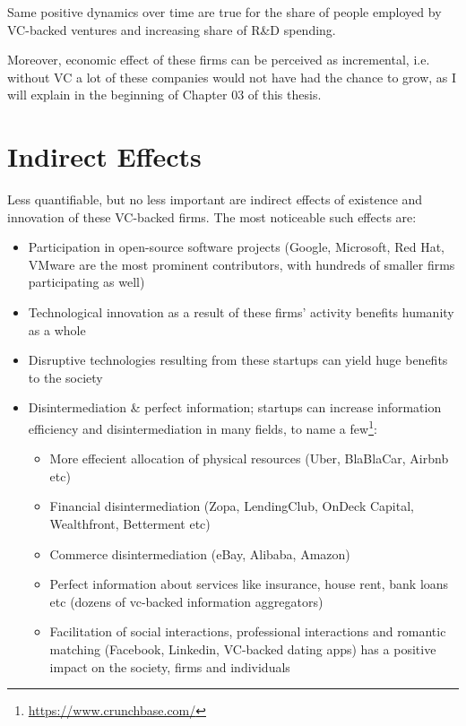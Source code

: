     Same positive dynamics over time are true for the share of people employed by VC-backed ventures and increasing share of R\&D spending.
    
    Moreover, economic effect of these firms can be perceived as incremental, i.e. without VC a lot of these companies would not have had the chance to grow, as I will explain in the beginning of Chapter 03 of this thesis.


\section{Indirect Effects}
    Less quantifiable, but no less important are indirect effects of existence and innovation of these VC-backed firms.
    The most noticeable such effects are: \vspace{0.3cm}
    \begin{itemize}
        \item Participation in open-source software projects (Google, Microsoft, Red Hat, VMware are the most prominent contributors, with hundreds of smaller firms participating as well)
        \item Technological innovation \parencite{vc_ru_usa} as a result of these firms' activity benefits humanity as a whole 
        \item Disruptive technologies resulting from these startups can yield huge benefits to the society \parencite{disrupt:2015}
        \item Disintermediation \& perfect information; startups can increase information efficiency and disintermediation in many fields, to name a few\footnote{\url{https://www.crunchbase.com/}}:
        \begin{itemize}
            \item More effecient allocation of physical resources (Uber, BlaBlaCar, Airbnb etc)
            \item Financial disintermediation (Zopa, LendingClub, OnDeck Capital, Wealthfront, Betterment etc)
            \item Commerce disintermediation (eBay, Alibaba, Amazon)
            \item Perfect information about services like insurance, house rent, bank loans etc (dozens of vc-backed information aggregators)
            \item Facilitation of social interactions, professional interactions and romantic matching (Facebook, Linkedin, VC-backed dating apps) has a positive impact on the society, firms and individuals 

\end{itemize}
\end{itemize}
